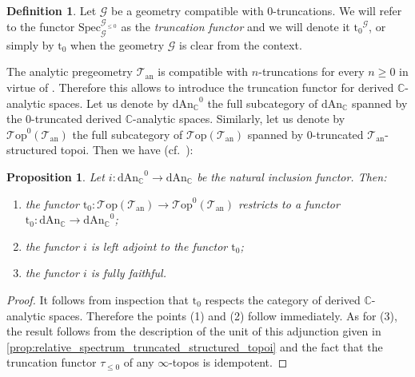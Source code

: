\documentclass[12pt,a4paper,reqno]{amsart}
\theoremstyle{plain}
\newtheorem{prop}[thm]{Proposition}
\theoremstyle{definition}
\newtheorem{defin}[thm]{Definition}
\theoremstyle{remark}
\numberwithin{equation}{section}
\begin{document}
\begin{defin}
	Let ${\mathcal G}$ be a geometry compatible with $0$-truncations. We will refer to the functor $\mathrm{Spec}^{{\mathcal G}_{\le 0}}_{\mathcal G}$ as the \emph{truncation functor} and we will denote it ${\mathrm{t}_0}^{\mathcal G}$, or simply by ${\mathrm{t}_0}$ when the geometry ${\mathcal G}$ is clear from the context.
\end{defin}

The analytic pregeometry ${{\mathcal T}_{\mathrm{an}}}$ is compatible with $n$-truncations for every $n \ge 0$ in virtue of \cite[Proposition 11.4]{DAG-IX}.
Therefore this allows to introduce the truncation functor for derived {$\mathbb C$-analytic\xspace} spaces.
Let us denote by ${\mathrm{dAn}_{\mathbb C}}^0$ the full subcategory of ${\mathrm{dAn}_{\mathbb C}}$ spanned by the $0$-truncated derived {$\mathbb C$-analytic\xspace} spaces.
Similarly, let us denote by ${\mathcal T\mathrm{op}}^0({{\mathcal T}_{\mathrm{an}}})$ the full subcategory of ${\mathcal T\mathrm{op}}({{\mathcal T}_{\mathrm{an}}})$ spanned by $0$-truncated ${{\mathcal T}_{\mathrm{an}}}$-structured topoi.
Then we have (cf.\ \cite[Proposition 2.2.4.4]{HAG-II}):

\begin{prop} \label{prop:truncation_and_finite_limits}
	Let $i \colon {\mathrm{dAn}_{\mathbb C}}^0 \to {\mathrm{dAn}_{\mathbb C}}$ be the natural inclusion functor. Then:
	\begin{enumerate}
		\item the functor ${\mathrm{t}_0} \colon {\mathcal T\mathrm{op}}({{\mathcal T}_{\mathrm{an}}}) \to {\mathcal T\mathrm{op}}^0({{\mathcal T}_{\mathrm{an}}})$ restricts to a functor ${\mathrm{t}_0} \colon {\mathrm{dAn}_{\mathbb C}} \to {\mathrm{dAn}_{\mathbb C}}^0$;
		\item the functor $i$ is left adjoint to the functor ${\mathrm{t}_0}$;
		\item the functor $i$ is fully faithful.
	\end{enumerate}
\end{prop}

\begin{proof}
	It follows from inspection that ${\mathrm{t}_0}$ respects the category of derived {$\mathbb C$-analytic\xspace} spaces.
	Therefore the points (1) and (2) follow immediately.
	As for (3), the result follows from the description of the unit of this adjunction given in \cref{prop:relative_spectrum_truncated_structured_topoi} and the fact that the truncation functor $\tau_{\le 0}$ of any $\infty$-topos is idempotent.
\end{proof}
\end{document}
